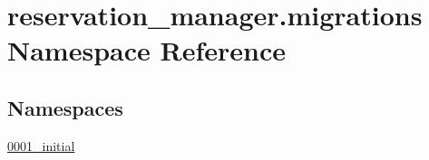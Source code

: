 \hypertarget{namespacereservation__manager_1_1migrations}{\section{reservation\-\_\-manager.\-migrations Namespace Reference}
\label{namespacereservation__manager_1_1migrations}
}
\subsection*{Namespaces}
\begin{DoxyCompactItemize}
\item 
\hyperlink{namespacereservation__manager_1_1migrations_1_10001__initial}{0001\-\_\-initial}
\end{DoxyCompactItemize}
